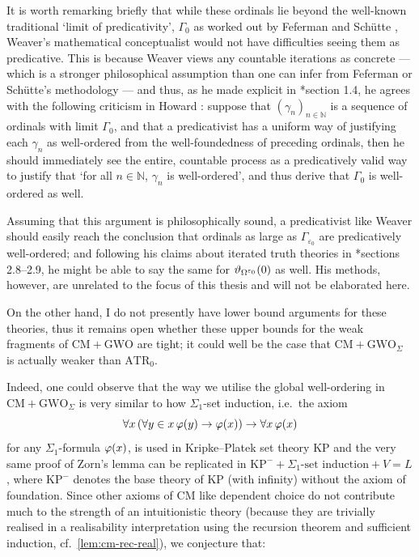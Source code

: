 \documentclass[12pt,openany]{book}
\makeatletter
\newcommand\inds[1]{\index{C@Set theory!#1}}
\theoremstyle{plain}
\theoremstyle{definition}
\newcommand\opA[1]{\mathop{\forall #1}}
\newcommand\ATR{\mathrm{ATR}}
\newcommand\KP{\mathrm{KP}}
\newcommand\CM{\mathrm{CM}}
\newcommand\GWO{\mathrm{GWO}}
\makeatother
\begin{document}
\label{loc:lim-pred-discuss}It is worth remarking briefly that while these ordinals lie beyond the well-known traditional `limit of predicativity', $\Gamma_0$ as worked out by Feferman \cite{feferman64-predicative-analysis} and Sch\"utte \cite{schutte65-predicative-well-orderings}, Weaver's mathematical conceptualist would not have difficulties seeing them as predicative. This is because Weaver views any countable iterations as concrete --- which is a stronger philosophical assumption than one can infer from Feferman or Sch\"utte's methodology --- and thus, as he made explicit in \cite{weaver09-predicativity}*{section 1.4}, he agrees with the following criticism in Howard \cite{howard96-proof-theory}: suppose that $\left(\gamma_n\right)_{n \in \mathbb{N}}$ is a sequence of ordinals with limit $\Gamma_0$, and that a predicativist has a uniform way of justifying each $\gamma_n$ as well-ordered from the well-foundedness of preceding ordinals, then he should immediately see the entire, countable process as a predicatively valid way to justify that `for all $n \in \mathbb{N}$, $\gamma_n$ is well-ordered', and thus derive that $\Gamma_0$ is well-ordered as well.

Assuming that this argument is philosophically sound, a predicativist like Weaver should easily reach the conclusion that ordinals as large as $\Gamma_{\varepsilon_0}$ are predicatively well-ordered; and following his claims about iterated truth theories in \cite{weaver09-predicativity}*{sections 2.8--2.9}, he might be able to say the same for $\vartheta_{\Omega^{\varepsilon_0}}\mleft(0\mright)$ as well. His methods, however, are unrelated to the focus of this thesis and will not be elaborated here.

On the other hand, I do not presently have lower bound arguments for these theories, thus it remains open whether these upper bounds for the weak fragments of $\CM + \GWO$ are tight; it could well be the case that $\CM + \GWO_\Sigma$ is actually weaker than $\ATR_0$.

Indeed, one could observe that the way we utilise the global well-ordering in $\CM + \GWO_\Sigma$ is very similar to how $\Sigma_1$-set induction\inds{set induction axiom!$\Sigma_1$-}, i.e.\ the axiom
\[\opA{x} \left(\opA{y \in x} \varphi\mleft(y\mright) \rightarrow \varphi\mleft(x\mright)\right) \rightarrow \opA{x} \varphi\mleft(x\mright)\]
for any $\Sigma_1$-formula $\varphi\mleft(x\mright)$, is used in Kripke--Platek set theory $\KP$ and the very same proof of Zorn's lemma can be replicated in $\KP^- + \Sigma_1\text{-set induction} + V = L$, where $\KP^-$ denotes the base theory of $\KP$ (with infinity) without the axiom of foundation. Since other axioms of $\CM$ like dependent choice do not contribute much to the strength of an intuitionistic theory (because they are trivially realised in a realisability interpretation using the recursion theorem and sufficient induction, cf.\ \autoref{lem:cm-rec-real}), we conjecture that:
\end{document}
